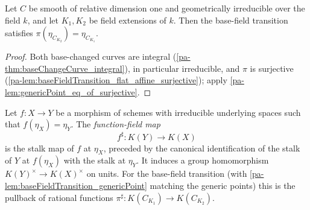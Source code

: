 \begin{lemma}
  \label{pa-lem:baseFieldTransition_genericPoint}
  \leanok

  Let \(C\) be smooth of relative dimension one and geometrically irreducible over the
  field \(k\), and let \(K_1, K_2\) be field extensions of \(k\). Then the base-field
  transition satisfies \(\pi(\eta_{C_{K_2}}) = \eta_{C_{K_1}}\).
\end{lemma}
\begin{proof}
  \leanok
  Both base-changed curves are integral (\ref{pa-thm:baseChangeCurve_integral}), in
  particular irreducible, and \(\pi\) is surjective
  (\ref{pa-lem:baseFieldTransition_flat_affine_surjective}); apply
  \ref{pa-lem:genericPoint_eq_of_surjective}.
\end{proof}

\begin{definition}
  \label{pa-def:functionFieldMap}
  \leanok

  Let \(f : X \to Y\) be a morphism of schemes with irreducible underlying spaces such
  that \(f(\eta_X) = \eta_Y\). The \emph{function-field map}
  \[
    f^{\sharp} : K(Y) \longrightarrow K(X)
  \]
  is the stalk map of \(f\) at \(\eta_X\), preceded by the canonical identification of
  the stalk of \(Y\) at \(f(\eta_X)\) with the stalk at \(\eta_Y\). It induces a group
  homomorphism \(K(Y)^{\times} \to K(X)^{\times}\) on units. For the base-field
  transition (with \ref{pa-lem:baseFieldTransition_genericPoint} matching the generic
  points) this is the pullback of rational functions
  \(\pi^{\sharp} : K(C_{K_1}) \to K(C_{K_2})\).
\end{definition}

